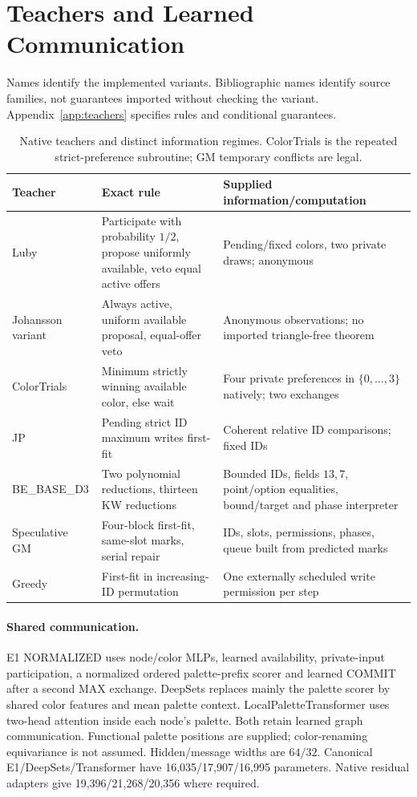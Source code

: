 \documentclass[10pt]{article}
\begin{document}
\section{Teachers and Learned Communication}
\label{sec:teachers}
Names identify the implemented variants. Bibliographic names identify source
families, not guarantees imported without checking the variant.
Appendix~\ref{app:teachers} specifies rules and conditional guarantees.
\begin{table}[htbp]\centering\small
\begin{tabular}{p{.16\linewidth}p{.40\linewidth}p{.35\linewidth}}
\toprule Teacher & Exact rule & Supplied information/computation \\
\midrule
Luby & Participate with probability $1/2$, propose uniformly available,
veto equal active offers & Pending/fixed colors, two private draws; anonymous \\
Johansson variant & Always active, uniform available proposal, equal-offer
veto & Anonymous observations; no imported triangle-free theorem \\
ColorTrials & Minimum strictly winning available color, else wait & Four
private preferences in $\{0,\ldots,3\}$ natively; two exchanges \\
JP & Pending strict ID maximum writes first-fit & Coherent relative ID
comparisons; fixed IDs \\
BE\_BASE\_D3 & Two polynomial reductions, thirteen KW reductions & Bounded
IDs, fields $13,7$, point/option equalities, bound/target and phase interpreter \\
Speculative GM & Four-block first-fit, same-slot marks, serial repair & IDs,
slots, permissions, phases, queue built from predicted marks \\
Greedy & First-fit in increasing-ID permutation & One externally scheduled
write permission per step \\
\bottomrule
\end{tabular}
\caption{Native teachers and distinct information regimes. ColorTrials is
the repeated strict-preference subroutine; GM temporary conflicts are legal.}
\label{tab:teachers}
\end{table}

\paragraph{Shared communication.}
E1 NORMALIZED uses node/color MLPs, learned availability, private-input
participation, a normalized ordered palette-prefix scorer and learned COMMIT
after a second MAX exchange. DeepSets \citep{zaheer2017sets} replaces mainly the palette scorer by
shared color features and mean palette context. LocalPaletteTransformer uses
two-head attention \citep{vaswani2017attention} inside each node's palette. Both retain learned graph
communication. Functional palette positions are supplied; color-renaming
equivariance is not assumed. Hidden/message widths are $64/32$. Canonical
E1/DeepSets/Transformer have 16,035/17,907/16,995 parameters. Native residual
adapters give 19,396/21,268/20,356 where required.
\end{document}
